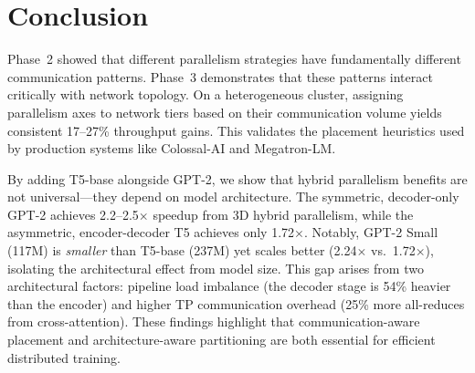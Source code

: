 \documentclass[conference]{IEEEtran}
\begin{document}
\section{Conclusion}

Phase~2 showed that different parallelism strategies have fundamentally different communication patterns. Phase~3 demonstrates that these patterns interact critically with network topology. On a heterogeneous cluster, assigning parallelism axes to network tiers based on their communication volume yields consistent 17--27\% throughput gains. This validates the placement heuristics used by production systems like Colossal-AI and Megatron-LM.

By adding T5-base alongside GPT-2, we show that hybrid parallelism benefits are not universal---they depend on model architecture. The symmetric, decoder-only GPT-2 achieves 2.2--2.5$\times$ speedup from 3D hybrid parallelism, while the asymmetric, encoder-decoder T5 achieves only 1.72$\times$. Notably, GPT-2 Small (117M) is \textit{smaller} than T5-base (237M) yet scales better (2.24$\times$ vs.\ 1.72$\times$), isolating the architectural effect from model size. This gap arises from two architectural factors: pipeline load imbalance (the decoder stage is 54\% heavier than the encoder) and higher TP communication overhead (25\% more all-reduces from cross-attention). These findings highlight that communication-aware placement and architecture-aware partitioning are both essential for efficient distributed training.



\end{document}
